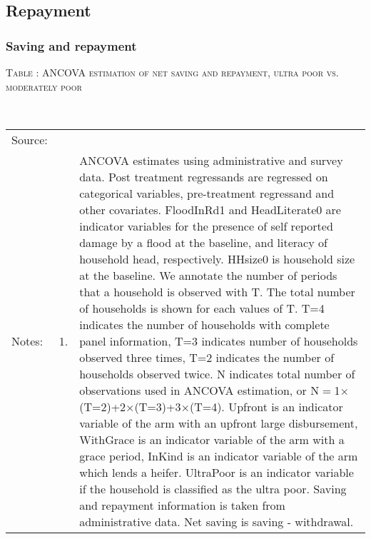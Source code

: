 \subsection{Repayment}
\label{Sec App Repay}
\subsubsection{Saving and repayment}

\hspace{-1cm}\begin{minipage}[t]{14cm}
\hfil\textsc{\normalsize Table \thetable: ANCOVA estimation of net saving and repayment, ultra poor vs. moderately poor\label{tab ANCOVA Repayment poverty}}\\
\setlength{\tabcolsep}{1pt}
\setlength{\baselineskip}{8pt}
\renewcommand{\arraystretch}{.55}
\hspace{-.75cm}\\
\renewcommand{\arraystretch}{.8}
\setlength{\tabcolsep}{1pt}
\begin{tabular}{>{\hfill\scriptsize}p{1cm}<{}>{\hfill\scriptsize}p{.25cm}<{}>{\scriptsize}p{12cm}<{\hfill}}
Source:& \multicolumn{2}{l}{\scriptsize Estimated with GUK administrative and survey data.}\\
Notes: & 1. & ANCOVA estimates using administrative and survey data. Post treatment regressands are regressed on categorical variables, pre-treatment regressand and other covariates. \textsf{FloodInRd1} and \textsf{HeadLiterate0} are indicator variables for the presence of self reported damage by a flood at the baseline, and literacy of household head, respectively. \textsf{HHsize0} is household size at the baseline. We annotate the number of periods that a household is observed with \textsf{T}. The total number of households is shown for each values of \textsf{T}. \textsf{T=4} indicates the number of households with complete panel information, \textsf{T=3} indicates number of households observed three times, \textsf{T=2} indicates the number of households observed twice. \textsf{N} indicates total number of observations used in ANCOVA estimation, or \textsf{N$=$1$\times$(T=2)+2$\times$(T=3)+3$\times$(T=4)}.  \textsf{Upfront} is an indicator variable of the arm with an upfront large disbursement, \textsf{WithGrace} is an indicator variable of the arm with a grace period, \textsf{InKind} is an indicator variable of the arm which lends a heifer. \textsf{UltraPoor} is an indicator variable if the household is classified as the ultra poor. Saving and repayment information is taken from administrative data. Net saving is saving - withdrawal. %

\end{tabular}
\end{minipage}
